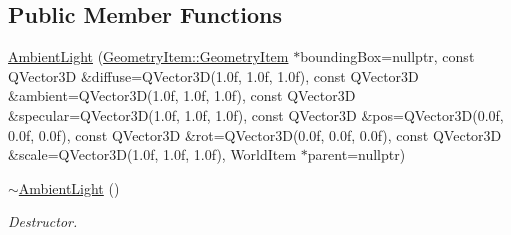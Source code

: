 \subsection*{Public Member Functions}
\begin{DoxyCompactItemize}
\item 
\mbox{\hyperlink{class_geometry_engine_1_1_geometry_world_item_1_1_geometry_light_1_1_ambient_light_af3902ecbb80cd014695d3ecfc35ace18}{Ambient\+Light}} (\mbox{\hyperlink{class_geometry_engine_1_1_geometry_world_item_1_1_geometry_item_1_1_geometry_item}{Geometry\+Item\+::\+Geometry\+Item}} $\ast$bounding\+Box=nullptr, const Q\+Vector3D \&diffuse=Q\+Vector3D(1.\+0f, 1.\+0f, 1.\+0f), const Q\+Vector3\+D \&ambient=\+Q\+Vector3\+D(1.\+0f, 1.\+0f, 1.\+0f), const Q\+Vector3\+D \&specular=\+Q\+Vector3\+D(1.\+0f, 1.\+0f, 1.\+0f), const Q\+Vector3\+D \&pos=\+Q\+Vector3\+D(0.\+0f, 0.\+0f, 0.\+0f), const Q\+Vector3\+D \&rot=\+Q\+Vector3\+D(0.\+0f, 0.\+0f, 0.\+0f), const Q\+Vector3\+D \&scale=\+Q\+Vector3\+D(1.\+0f, 1.\+0f, 1.\+0f), World\+Item $\ast$parent=nullptr)
\item 
\mbox{\label{class_geometry_engine_1_1_geometry_world_item_1_1_geometry_light_1_1_ambient_light_ab60967e98b1d6931e49519fddb1b69af}} 
\mbox{\hyperlink{class_geometry_engine_1_1_geometry_world_item_1_1_geometry_light_1_1_ambient_light_ab60967e98b1d6931e49519fddb1b69af}{$\sim$\+Ambient\+Light}} ()
\begin{DoxyCompactList}\small\item\em Destructor. \end{DoxyCompactList}\end{DoxyCompactItemize}
